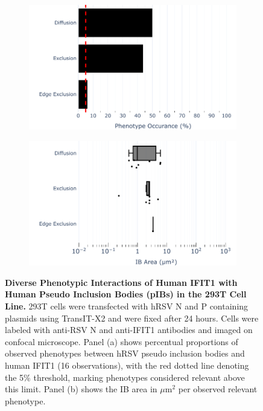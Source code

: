 \begin{figure}
    \begin{subfigure}{0.495\textwidth}
        \caption{}
        \includegraphics[width=1\linewidth]{09. Chapter 4/Figs/01. pIB/02. IFIT1/01. bar_i1_293t.pdf} 
    \end{subfigure}
    \begin{subfigure}{0.495\textwidth}
        \caption{}
        \includegraphics[width=1\linewidth]{09. Chapter 4/Figs/01. pIB/02. IFIT1/02. box_i1_293t.pdf}
    \end{subfigure}
    \caption[Diverse Phenotypic Interactions of Human IFIT1 with Human Pseudo Inclusion Bodies (pIBs) in the 293T Cell Line.]{\textbf{Diverse Phenotypic Interactions of Human IFIT1 with Human Pseudo Inclusion Bodies (pIBs) in the 293T Cell Line.} 293T cells were transfected with hRSV N and P containing plasmids using TransIT-X2 and were fixed after 24 hours. Cells were labeled with anti-RSV N and anti-IFIT1 antibodies and imaged on confocal microscope. Panel (a) shows percentual proportions of observed phenotypes between hRSV pseudo inclusion bodies and human IFIT1 (16 observations), with the red dotted line denoting the 5\% threshold, marking phenotypes considered relevant above this limit. Panel (b) shows the IB area in \(\mu \mbox{m}^2\) per observed relevant phenotype.}
    \label{fig:Diverse Phenotypic Interactions of Human IFIT1 with Human Pseudo Inclusion Bodies (pIBs) in the 293T Cell Line}
\end{figure}

